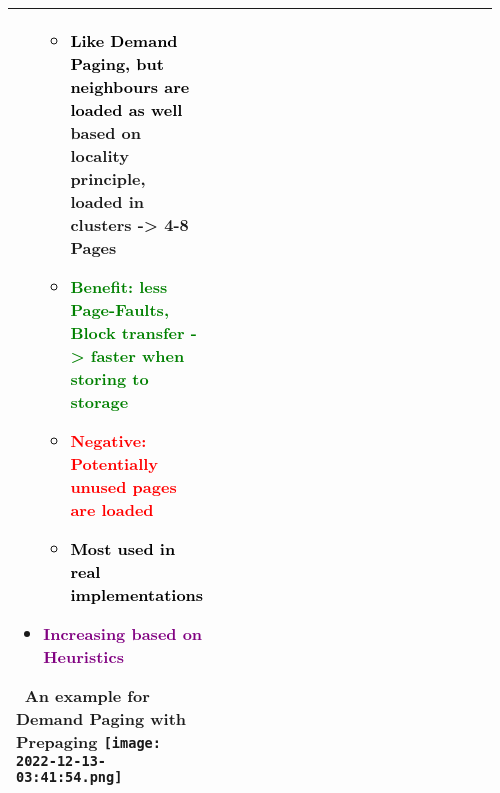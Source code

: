 \documentclass[main.tex,fontsize=8pt,paper=a4,paper=portrait,DIV=calc,]{scrartcl}
\begin{document}
\begin{table}[ht!]
\begin{tabular}{|m{0.2\linewidth}|m{0.755\linewidth}|}
\begin{itemize}
\begin{itemize}
  \item \textcolor{black}{Like Demand Paging, but neighbours are loaded as well}\newline
    based on locality principle, loaded in clusters -> 4-8 Pages
  \item \textcolor{green}{Benefit: less Page-Faults, Block transfer -> faster when storing to storage}
  \item \textcolor{red}{Negative: Potentially unused pages are loaded}
  \item \textcolor{black}{Most used in real implementations}
  \end{itemize} 
\item \textcolor{purple}{Increasing based on Heuristics}\newline
\vspace{-3mm}
\end{itemize} 
\, \newline
An example for \textbf{Demand Paging with Prepaging}\newline
\texttt{[image: 2022-12-13-03:41:54.png]}\\
\hline
\end{tabular}
\end{table}
\end{document}

